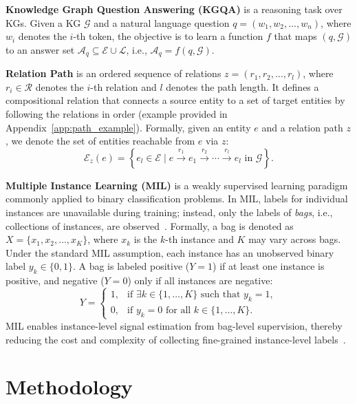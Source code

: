 \documentclass{article}
\begin{document}
\textbf{Knowledge Graph Question Answering (KGQA)} is a reasoning task over KGs. Given a KG $\mathcal{G}$ and a natural language question $q=(w_1,w_2,\ldots,w_n)$, where $w_i$ denotes the $i$-th token, the objective is to learn a function $f$ that maps $(q,\mathcal{G})$ to an answer set $\mathcal{A}_q \subseteq \mathcal{E}\cup\mathcal{L}$, i.e., $\mathcal{A}_q=f(q,\mathcal{G})$.

\textbf{Relation Path} is an ordered sequence of relations
$z=(r_1,r_2,\ldots,r_l)$, where $r_i \in \mathcal{R}$ denotes the $i$-th relation and $l$ denotes the path length. 
It defines a compositional relation that connects a source entity to a set of target entities by following the relations in order (example provided in Appendix~\ref{app:path_example}). 
Formally, given an entity $e$ and a relation path $z$, we denote the set of entities reachable from $e$ via $z$:
\[
\mathcal{E}_z(e)
=
\left\{
e_l \in \mathcal{E}
\mid
e \xrightarrow{r_1} e_1 \xrightarrow{r_2} \cdots \xrightarrow{r_l} e_l
\text{ in } \mathcal{G}
\right\}.
\]


\textbf{Multiple Instance Learning (MIL)} is a weakly supervised learning paradigm commonly applied to binary classification problems. In MIL, labels for individual instances are unavailable during training; instead, only the labels of \textit{bags}, i.e., collections of instances, are observed~\citep{ilse_attnmil_2018, hense_xmil_2024}. Formally, a bag is denoted as $X=\{x_1, x_2,\dots,x_K\}$, where $x_k$ is the $k$-th instance and $K$ may vary across bags. Under the standard MIL assumption, each instance has an unobserved binary label $y_k \in \{0,1\}$. A bag is labeled positive ($Y=1$) if at least one instance is positive, and negative ($Y=0$) only if all instances are negative:
\vspace{-1mm}
\begin{equation}
Y =
\begin{cases}
1, & \text{if } \exists k \in \{1,\ldots,K\} \text{ such that } y_k=1,\\
0, & \text{if } y_k=0 \text{ for all } k \in \{1,\ldots,K\}.
\end{cases}
\end{equation}
MIL enables instance-level signal estimation from bag-level supervision, thereby reducing the cost and complexity of collecting fine-grained instance-level labels~\citep{jang_millearnable_2024}.

\section{Methodology}\label{sec:method}
\end{document}
